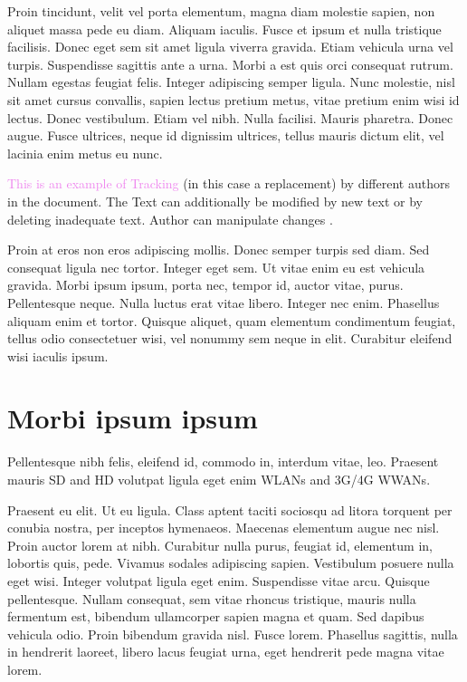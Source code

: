Proin tincidunt, velit vel porta elementum, magna diam molestie sapien, non aliquet massa pede eu diam. Aliquam iaculis. Fusce et ipsum et nulla tristique facilisis. Donec eget sem sit amet ligula viverra gravida. Etiam vehicula urna vel turpis. Suspendisse sagittis ante a urna. Morbi a est quis orci consequat rutrum. Nullam egestas feugiat felis. Integer adipiscing semper ligula. Nunc molestie, nisl sit amet cursus convallis, sapien lectus pretium metus, vitae pretium enim wisi id lectus. Donec vestibulum. Etiam vel nibh. Nulla facilisi. Mauris pharetra. Donec augue. Fusce ultrices, neque id dignissim ultrices, tellus mauris dictum elit, vel lacinia enim metus eu nunc.

\textcolor{violet}{This is an example of Tracking}  (in this case a replacement) by different authors in the document. The Text can additionally be modified by  new text or by deleting  inadequate text. Author can manipulate changes .

Proin at eros non eros adipiscing mollis. Donec semper turpis sed diam. Sed consequat ligula nec tortor. Integer eget sem. Ut vitae enim eu est vehicula gravida. Morbi ipsum ipsum, porta nec, tempor id, auctor vitae, purus. Pellentesque neque. Nulla luctus erat vitae libero. Integer nec enim. Phasellus aliquam enim et tortor. Quisque aliquet, quam elementum condimentum feugiat, tellus odio consectetuer wisi, vel nonummy sem neque in elit. Curabitur eleifend wisi iaculis ipsum.
\section{Morbi ipsum ipsum}
Pellentesque nibh felis, eleifend id, commodo in, interdum vitae, leo. 
 Praesent mauris \ac{SD} and \ac{HD} volutpat ligula eget enim \acp{WLAN} and 3G\slash 4G \acp{WWAN}.

Praesent eu elit. Ut eu ligula. Class aptent taciti sociosqu ad litora torquent per conubia nostra, per inceptos hymenaeos. Maecenas elementum augue nec nisl. Proin auctor lorem at nibh. Curabitur nulla purus, feugiat id, elementum in, lobortis quis, pede. Vivamus sodales adipiscing sapien. Vestibulum posuere nulla eget wisi. Integer volutpat ligula eget enim. Suspendisse vitae arcu. Quisque pellentesque. Nullam consequat, sem vitae rhoncus tristique, mauris nulla fermentum est, bibendum ullamcorper sapien magna et quam. Sed dapibus vehicula odio. Proin bibendum gravida nisl. Fusce lorem. Phasellus sagittis, nulla in hendrerit laoreet, libero lacus feugiat urna, eget hendrerit pede magna vitae lorem. 
 
